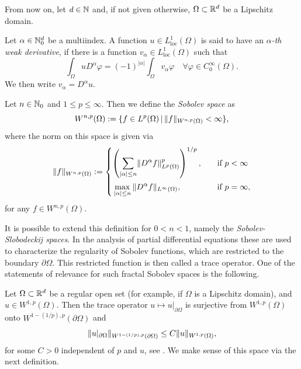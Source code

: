 From now on, let $d \in \mathbb{N}$ and, if not given otherwise, $\Omega \subset \mathbb{R}^d$ be a Lipschitz domain.

\begin{definition}
    Let $\alpha \in \mathbb{N}_0^d$ be a multiindex. A function $u \in L^1_\text{loc}(\Omega)$ is said to have an \emph{$\alpha$-th 
    weak derivative}, if there is a function $v_\alpha \in L^1_\text{loc}(\Omega)$ such that
    \begin{equation*}
        \int_\Omega u D^\alpha \varphi = (-1)^{\vert \alpha \vert} \int_\Omega v_\alpha \varphi \quad \forall
        \varphi \in C_0^\infty(\Omega).
    \end{equation*}
    We then write $v_\alpha = D^\alpha u$.
\end{definition}

\begin{definition} \label{def: sobolev space}
    Let $n \in \mathbb{N}_0$ and $1 \leq p \leq \infty$. Then we define the \emph{Sobolev space} as
    \begin{equation*}
        W^{n, p}(\Omega) := \{ f \in L^p(\Omega) \, \vert \, \lVert f \rVert_{W^{n, p}(\Omega)} < \infty \},
    \end{equation*}
    where the norm on this space is given via
    \begin{equation*}
        \lVert f \rVert_{W^{n, p}(\Omega)} := \begin{cases}
            \displaystyle
            \left( \sum\limits_{\vert \alpha \vert \leq n} \lVert D^\alpha f \rVert^p_{L^p(\Omega)} \right)^{1/p}, 
            \quad &\text{if } p<\infty \\[1.5em]
            \displaystyle
            \, \max\limits_{\vert \alpha \vert \leq n} \, \lVert D^\alpha f \rVert_{L^\infty(\Omega)}, \quad &\text{if } p = \infty,
        \end{cases}
    \end{equation*}
    for any $f \in W^{n, p}(\Omega)$.
\end{definition}

It is possible to extend this definition for $0 < n < 1$, namely the \emph{Sobolev-Slobodeckij spaces}. In the 
analysis of partial differential equations these are used to characterize the regularity of Sobolev functions,
which are restricted to the boundary $\partial \Omega$. This restricted function is then called a trace operator.
One of the statements of relevance for such fractal Sobolev spaces is the following.

Let $\Omega \subset \mathbb{R}^d$ be a regular open set (for example, if $\Omega$ is a Lipschitz domain), and
$u \in W^{1, p}(\Omega)$. Then the trace operator $u \mapsto u \vert_{\partial \Omega}$ is surjective
from $W^{1, p}(\Omega)$ onto $W^{1-(1/p), p}(\partial \Omega)$ and
\begin{equation*}
    \lVert u \vert_{\partial \Omega} \rVert_{W^{1-(1/p), p}(\partial \Omega)} \leq C \lVert u \rVert_{W^{1, p}(\Omega)},
\end{equation*}
for some $C > 0$ independent of $p$ and $u$, see \cite[p. 315]{brezis2011}.
We make sense of this space via the next definition.

